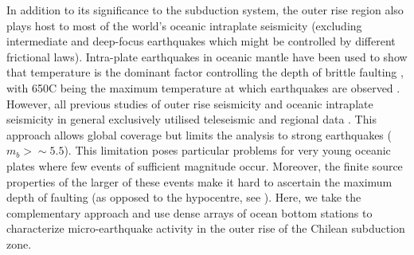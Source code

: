 \documentclass[reviewcopy]{elsarticle}
\begin{document}
In addition to
its significance to the subduction system, the outer rise region also
plays host to most of the world's oceanic intraplate  seismicity
(excluding intermediate and deep-focus earthquakes which might be
controlled by different frictional laws).
Intra-plate earthquakes in oceanic mantle have been used to show that
temperature is the dominant factor controlling the
depth of brittle faulting \citep{wiens83}, with 650\dg C being the
maximum temperature at which earthquakes are observed
\citep{mckenzie05}.
However, all previous studies of outer rise seismicity and oceanic
intraplate seismicity in general exclusively utilised teleseismic and
regional data \citep[e.g.][]{wiens83,christensen88}. This approach allows global
  coverage but limits the analysis to strong earthquakes ($m_b>\sim
  5.5$). This limitation poses particular problems for very young
  oceanic plates where few events of sufficient magnitude
  occur.   %
Moreover, the finite source properties of the larger of these events
make it hard to ascertain the maximum depth of faulting (as opposed to
the hypocentre, see \citet{tichelaar92}).
Here, we take the complementary approach and use dense arrays of
ocean bottom stations to characterize micro-earthquake activity in the
outer rise of the Chilean subduction zone.
\end{document}
